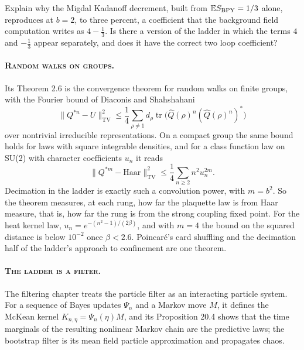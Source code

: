 \begin{problem}\label{op:neigh2}
Explain why the Migdal Kadanoff decrement, built from $\mathbb{E} S_{\mathrm{BPY}}=1/3$ alone, reproduces at $b=2$, to three percent, a coefficient that the background field computation writes as $4-\frac13$. Is there a version of the ladder in which the terms $4$ and $-\frac13$ appear separately, and does it have the correct two loop coefficient?
\end{problem}

\paragraph{\normalfont\scshape Random walks on groups.}
Its Theorem 2.6 is the convergence theorem for random walks on finite groups, with the Fourier bound of Diaconis and Shahshahani~\cite{DS81}
\[
\|Q^{*n}-U\|_{\mathrm{TV}}^2\le\frac14\sum_{\rho\ne1}d_\rho\operatorname{tr}\big(\hat Q(\rho)^n(\hat Q(\rho)^n)^*\big)
\]
over nontrivial irreducible representations. On a compact group the same bound holds for laws with square integrable densities, and for a class function law on SU(2) with character coefficients $u_n$ it reads
\[
\|Q^{*m}-\mathrm{Haar}\|_{\mathrm{TV}}^2\le\frac14\sum_{n\ge2}n^2u_n^{2m} .
\]
Decimation in the ladder is exactly such a convolution power, with $m=b^2$. So the theorem measures, at each rung, how far the plaquette law is from Haar measure, that is, how far the rung is from the strong coupling fixed point. For the heat kernel law, $u_n=e^{-(n^2-1)/(2\beta)}$, and with $m=4$ the bound on the squared distance is below $10^{-2}$ once $\beta<2.6$. Poincar\'e's card shuffling and the decimation half of the ladder's approach to confinement are one theorem.

\paragraph{\normalfont\scshape The ladder is a filter.} 
The filtering chapter treats the particle filter as an interacting particle system. For a sequence of Bayes updates $\Psi_n$ and a Markov move $M$, it defines the McKean kernel $K_{n,\eta}=\Psi_n(\eta)M$, and its Proposition 20.4 shows that the time marginals of the resulting nonlinear Markov chain are the predictive laws; the bootstrap filter is its mean field particle approximation and propagates chaos.

